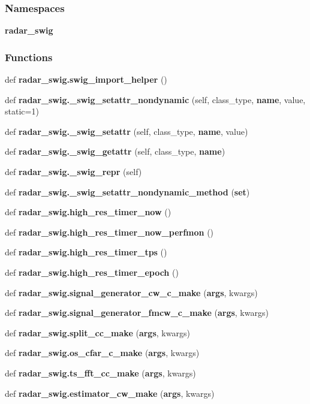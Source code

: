 \subsubsection*{Namespaces}
\begin{DoxyCompactItemize}
\item 
 {\bf radar\+\_\+swig}
\end{DoxyCompactItemize}
\subsubsection*{Functions}
\begin{DoxyCompactItemize}
\item 
def {\bf radar\+\_\+swig.\+swig\+\_\+import\+\_\+helper} ()
\item 
def {\bf radar\+\_\+swig.\+\_\+swig\+\_\+setattr\+\_\+nondynamic} (self, class\+\_\+type, {\bf name}, value, static=1)
\item 
def {\bf radar\+\_\+swig.\+\_\+swig\+\_\+setattr} (self, class\+\_\+type, {\bf name}, value)
\item 
def {\bf radar\+\_\+swig.\+\_\+swig\+\_\+getattr} (self, class\+\_\+type, {\bf name})
\item 
def {\bf radar\+\_\+swig.\+\_\+swig\+\_\+repr} (self)
\item 
def {\bf radar\+\_\+swig.\+\_\+swig\+\_\+setattr\+\_\+nondynamic\+\_\+method} ({\bf set})
\item 
def {\bf radar\+\_\+swig.\+high\+\_\+res\+\_\+timer\+\_\+now} ()
\item 
def {\bf radar\+\_\+swig.\+high\+\_\+res\+\_\+timer\+\_\+now\+\_\+perfmon} ()
\item 
def {\bf radar\+\_\+swig.\+high\+\_\+res\+\_\+timer\+\_\+tps} ()
\item 
def {\bf radar\+\_\+swig.\+high\+\_\+res\+\_\+timer\+\_\+epoch} ()
\item 
def {\bf radar\+\_\+swig.\+signal\+\_\+generator\+\_\+cw\+\_\+c\+\_\+make} ({\bf args}, kwargs)
\item 
def {\bf radar\+\_\+swig.\+signal\+\_\+generator\+\_\+fmcw\+\_\+c\+\_\+make} ({\bf args}, kwargs)
\item 
def {\bf radar\+\_\+swig.\+split\+\_\+cc\+\_\+make} ({\bf args}, kwargs)
\item 
def {\bf radar\+\_\+swig.\+os\+\_\+cfar\+\_\+c\+\_\+make} ({\bf args}, kwargs)
\item 
def {\bf radar\+\_\+swig.\+ts\+\_\+fft\+\_\+cc\+\_\+make} ({\bf args}, kwargs)
\item 
def {\bf radar\+\_\+swig.\+estimator\+\_\+cw\+\_\+make} ({\bf args}, kwargs)

\end{DoxyCompactItemize}
